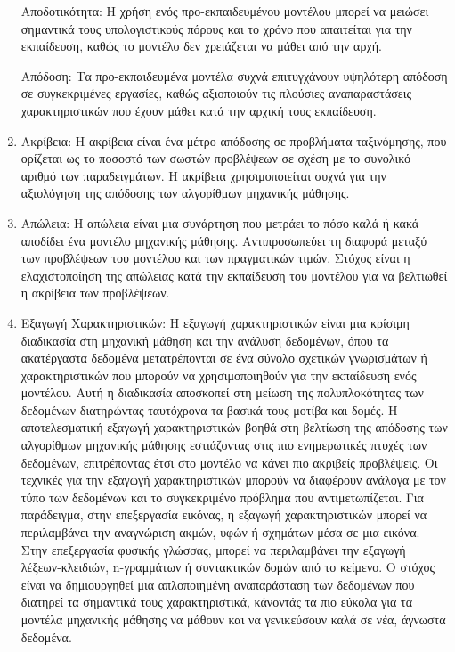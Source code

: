 \begin{enumerate}
    Αποδοτικότητα: Η χρήση ενός προ-εκπαιδευμένου μοντέλου μπορεί να μειώσει σημαντικά τους υπολογιστικούς πόρους και το χρόνο που απαιτείται για την εκπαίδευση, καθώς το μοντέλο δεν χρειάζεται να μάθει από την αρχή.
    
    Απόδοση: Τα προ-εκπαιδευμένα μοντέλα συχνά επιτυγχάνουν υψηλότερη απόδοση σε συγκεκριμένες εργασίες, καθώς αξιοποιούν τις πλούσιες αναπαραστάσεις χαρακτηριστικών που έχουν μάθει κατά την αρχική τους εκπαίδευση.

    \item Ακρίβεια: Η ακρίβεια είναι ένα μέτρο απόδοσης σε προβλήματα ταξινόμησης, που ορίζεται ως το ποσοστό των σωστών προβλέψεων σε σχέση με το συνολικό αριθμό των παραδειγμάτων. Η ακρίβεια χρησιμοποιείται συχνά για την αξιολόγηση της απόδοσης των αλγορίθμων μηχανικής μάθησης.

    \item Απώλεια: Η απώλεια είναι μια συνάρτηση που μετράει το πόσο καλά ή κακά αποδίδει ένα μοντέλο μηχανικής μάθησης. Αντιπροσωπεύει τη διαφορά μεταξύ των προβλέψεων του μοντέλου και των πραγματικών τιμών. Στόχος είναι η ελαχιστοποίηση της απώλειας κατά την εκπαίδευση του μοντέλου για να βελτιωθεί η ακρίβεια των προβλέψεων.

    \item Εξαγωγή Χαρακτηριστικών: Η εξαγωγή χαρακτηριστικών είναι μια κρίσιμη διαδικασία στη μηχανική μάθηση και την ανάλυση δεδομένων, όπου τα ακατέργαστα δεδομένα μετατρέπονται σε ένα σύνολο σχετικών γνωρισμάτων ή χαρακτηριστικών που μπορούν να χρησιμοποιηθούν για την εκπαίδευση ενός μοντέλου. Αυτή η διαδικασία αποσκοπεί στη μείωση της πολυπλοκότητας των δεδομένων διατηρώντας ταυτόχρονα τα βασικά τους μοτίβα και δομές. Η αποτελεσματική εξαγωγή χαρακτηριστικών βοηθά στη βελτίωση της απόδοσης των αλγορίθμων μηχανικής μάθησης εστιάζοντας στις πιο ενημερωτικές πτυχές των δεδομένων, επιτρέποντας έτσι στο μοντέλο να κάνει πιο ακριβείς προβλέψεις. Οι τεχνικές για την εξαγωγή χαρακτηριστικών μπορούν να διαφέρουν ανάλογα με τον τύπο των δεδομένων και το συγκεκριμένο πρόβλημα που αντιμετωπίζεται. Για παράδειγμα, στην επεξεργασία εικόνας, η εξαγωγή χαρακτηριστικών μπορεί να περιλαμβάνει την αναγνώριση ακμών, υφών ή σχημάτων μέσα σε μια εικόνα. Στην επεξεργασία φυσικής γλώσσας, μπορεί να περιλαμβάνει την εξαγωγή λέξεων-κλειδιών, n-γραμμάτων ή συντακτικών δομών από το κείμενο. Ο στόχος είναι να δημιουργηθεί μια απλοποιημένη αναπαράσταση των δεδομένων που διατηρεί τα σημαντικά τους χαρακτηριστικά, κάνοντάς τα πιο εύκολα για τα μοντέλα μηχανικής μάθησης να μάθουν και να γενικεύσουν καλά σε νέα, άγνωστα δεδομένα.


\end{enumerate}
